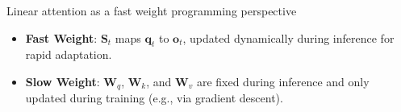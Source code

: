 \begin{frame}{Linear attention as a fast weight programming perspective}
    
        
    
\vspace{-4mm}
\begin{itemize}
    \item {\color{red}\textbf{Fast Weight}}: $\mathbf{S}_t$ maps $\mathbf{q}_t$ to $\mathbf{o}_t$, updated dynamically during inference  for rapid adaptation.
    \item {\color{red}\textbf{Slow Weight}}: $\mathbf{W}_q$, $\mathbf{W}_k$, and $\mathbf{W}_v$ are fixed during inference and only updated during training (e.g., via gradient descent).
\end{itemize}




\end{frame}

